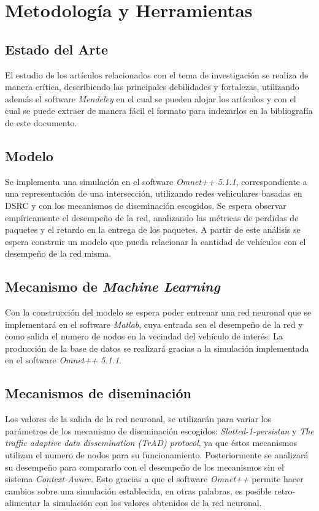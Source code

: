 \section{Metodología y Herramientas}

\subsection*{Estado del Arte}
El estudio de los artículos relacionados con el tema de investigación se realiza de manera crítica, describiendo las principales debilidades y fortalezas, utilizando además el software \textit{Mendeley} en el cual se pueden alojar los artículos y con el cual se puede extraer de manera fácil el formato para indexarlos en la bibliografía de este documento.

\subsection*{Modelo}
Se implementa una simulación en el software \textit{Omnet++ 5.1.1}, correspondiente a una representación de una intersección, utilizando redes vehiculares basadas en DSRC y con los mecanismos de diseminación escogidos. Se espera observar empíricamente el desempeño de la red, analizando las métricas de perdidas de paquetes y el retardo en la entrega de los paquetes. A partir de este análisis se espera construir un modelo que pueda relacionar la cantidad de vehículos con el desempeño de la red misma. 

\subsection*{Mecanismo de \textit{Machine Learning}}
Con la construcción del modelo se espera poder entrenar una red neuronal que se implementará en el software \textit{Matlab}, cuya entrada sea el desempeño de la red y como salida el numero de nodos en la vecindad del vehículo de interés. La producción de la base de datos se realizará gracias a la simulación implementada en el software \textit{Omnet++ 5.1.1}. 

\subsection*{Mecanismos de diseminación}

Los valores de la salida de la red neuronal, se utilizarán para variar los parámetros de los mecanismo de diseminación escogidos: \cite{Wisitpongphan2007} \textit{Slotted-1-persistan} y \cite{TraD} \textit{The traffic adaptive data dissemination (TrAD) protocol}, ya que éstos mecanismos utilizan el numero de nodos para su funcionamiento.
Posteriormente se analizará su desempeño para compararlo con el desempeño de los mecanismos sin el sistema \textit{Context-Aware}. Esto gracias a que el software \textit{Omnet++} permite hacer cambios sobre una simulación establecida, en otras palabras, es posible retro-alimentar la simulación con los valores obtenidos de la red neuronal.

